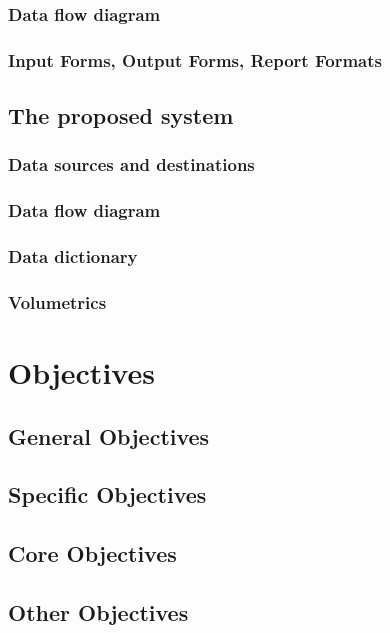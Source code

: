 \subsubsection{Data flow diagram}

\subsubsection{Input Forms, Output Forms, Report Formats}

\subsection{The proposed system}

\subsubsection{Data sources and destinations}

\subsubsection{Data flow diagram}

\subsubsection{Data dictionary}

\subsubsection{Volumetrics}

\section{Objectives}

\subsection{General Objectives}

\subsection{Specific Objectives}

\subsection{Core Objectives}

\subsection{Other Objectives}

